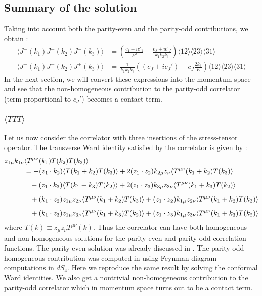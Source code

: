 \documentclass[a4paper,11pt]{article}
\begin{document}
\subsection*{Summary of the solution}
Taking into account both the parity-even and the parity-odd contributions, we obtain :
\begin{align}
\label{jjjshal}
\langle J^-(k_1) J^-(k_2)J^-(k_3) \rangle&=\left(\frac{c_1+i c'_1}{E^3}+\frac{c_J+ i c'_J }{k_1 k_2 k_3}\right)\langle 12 \rangle \langle 23 \rangle \langle 31 \rangle\\
\langle J^-(k_1) J^-(k_2)J^+(k_3) \rangle &=\,\frac{ 1}{k_1 k_2 k_3}\left((c_J+i c_J')-c_J\frac{2 k_3}{E}\right)\langle 12 \rangle \langle 2\bar{3} \rangle \langle \bar{3}1 \rangle
\end{align}
In the next section, we will convert these expressions into the momentum space and see that the non-homogeneous contribution to the parity-odd correlator (term proportional to $c_J'$) becomes a contact term.


\subsubsection{$\langle TTT \rangle$}
Let us now consider the correlator with three insertions of the stress-tensor operator.  
The transverse Ward identity satisfied by the correlator is given by \cite{Bzowski:2013sza,Bzowski:2017poo,Baumann:2020dch}:
\begin{align}\label{wtidttt}
\begin{split}
z_{1\mu}k_{1\nu}&\langle T^{\mu\nu}(k_1) T(k_2) T(k_3) \rangle \\
&= -(z_1 \cdot k_2) \langle T(k_1 + k_2) T(k_3) \rangle +2(z_1 \cdot z_2)k_{2\mu}z_{\nu}\langle T^{\mu\nu}(k_1+k_2) T(k_3) \rangle\\[5 pt]
&\hspace{.3cm}-(z_1 \cdot k_3)\langle  T(k_1+k_3) T(k_2) \rangle + 2(z_1 \cdot z_3)k_{3\mu}z_{3\nu}\langle T^{\mu\nu}(k_1+k_3) T(k_2) \rangle\\[5 pt]
&\hspace{.3cm}+(k_1 \cdot z_2)z_{1\mu}z_{2\nu}\langle T^{\mu\nu}(k_1+k_2) T(k_3) \rangle+(z_1 \cdot z_2)k_{1\mu}z_{2\nu}\langle T^{\mu\nu}(k_1+k_2) T(k_3) \rangle\\[5 pt]
&\hspace{.3cm}+(k_1 \cdot z_3)z_{1\mu}z_{3\nu}\langle T^{\mu\nu}(k_1+k_3) T(k_2) \rangle+(z_1 \cdot z_3)k_{1\mu}z_{3\nu}\langle T^{\mu\nu}(k_1+k_3) T(k_2) \rangle
\end{split}
\end{align}
where $T(k)\equiv z_{\mu}z_{\nu}T^{\mu\nu}(k)$. Thus the correlator can have both homogeneous and non-homogeneous solutions for the parity-even  and parity-odd correlation functions. The parity-even solution was already discussed in \cite{Bzowski:2013sza}. The parity-odd homogeneous contribution was computed in \cite{Maldacena:2011nz} using Feynman diagram computations in $dS_4$. Here we reproduce the same result by solving the conformal Ward identities. We also get a nontrivial non-homogeneous contribution to the parity-odd correlator which in momentum space turns out to be a contact term. 
\end{document}
